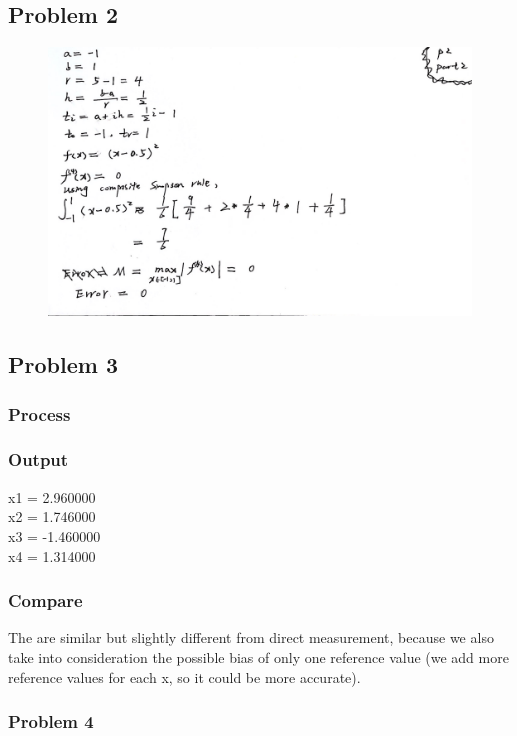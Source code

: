 \documentclass[11pt,fleqn]{exam}
\begin{document}
\subsection*{Problem 2}
\begin{figure}[H]
  	\centering
  	\includegraphics[width=1\textwidth]{p2.jpg}
\end{figure}

\subsection*{Problem 3}
\subsubsection*{Process}

\subsubsection*{Output}
x1 = 2.960000\\
x2 = 1.746000\\
x3 = -1.460000\\
x4 = 1.314000\\
\subsubsection*{Compare}
The are similar but slightly different from direct measurement, because we also take into consideration the possible bias of only one reference value (we add more reference values for each x, so it could be more accurate).

\subsubsection*{Problem 4}
\end{document}
